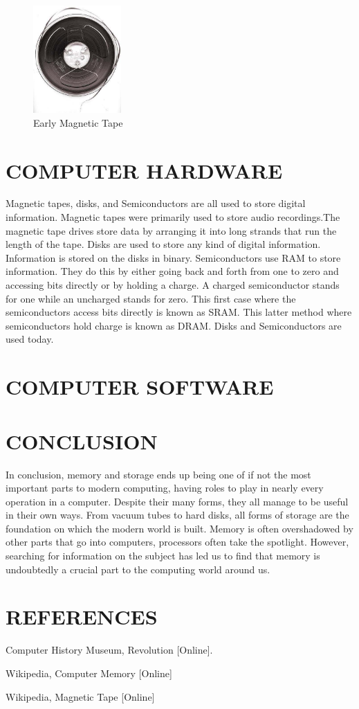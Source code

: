\documentclass[letterpaper, 10 pt, conference]{IEEEconf}
\begin{document}

\begin{figure}[h!]
\centering
\includegraphics[width=0.3\textwidth]{Magtape1.jpg}
\caption{Early Magnetic Tape}
\label{fig:example}
\end{figure} 

\section{COMPUTER HARDWARE}
Magnetic tapes, disks, and Semiconductors are all used to store digital information. Magnetic tapes were primarily used to store audio recordings.The magnetic tape drives store data by arranging it into long strands that run the length of the tape. Disks are used to store any kind of digital information. Information is stored on the disks in binary. Semiconductors use RAM to store information. They do this by either going back and forth from one to zero and accessing bits directly or by holding a charge. A charged semiconductor stands for one while an uncharged stands for zero. This first case where the semiconductors access bits directly is known as SRAM. This latter method where semiconductors hold charge is known as DRAM. Disks and Semiconductors are used today. 

\section{COMPUTER SOFTWARE}

\section{CONCLUSION}
In conclusion, memory and storage ends up being one of if not the most important parts to modern computing, having roles to play in nearly every operation in a computer. Despite their many forms, they all manage to be useful in their own ways. From vacuum tubes to hard disks, all forms of storage are the foundation on which the modern world is built. Memory is often overshadowed by other parts that go into computers, processors often take the spotlight. However, searching for information on the subject has led us to find that memory is undoubtedly a crucial part to the computing world around us.


\section*{REFERENCES}

\begin{enumerate}[label={[\arabic*]}]

\item Computer History Museum, Revolution [Online]. 
\item Wikipedia, Computer Memory [Online]
\item Wikipedia, Magnetic Tape [Online]
\end{enumerate}
\end{document}
